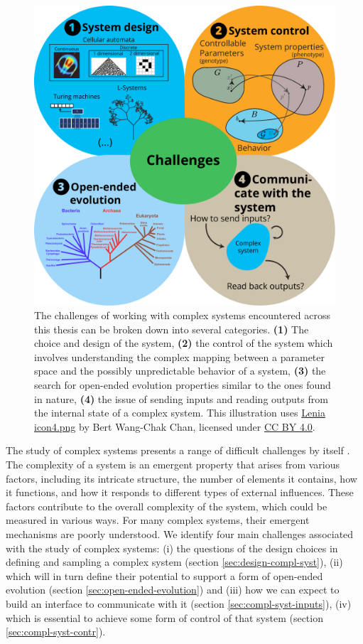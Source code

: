 \begin{figure}[htbp]
  \centering
  \includegraphics[width=.98\linewidth]{figures/challenges}
  \caption{The challenges of working with complex systems encountered across
    this thesis can be broken down into several categories. \textbf{(1)} The choice
    and design of the system, \textbf{(2)} the control of the system which
    involves understanding the complex mapping between a parameter space and the
    possibly unpredictable behavior of a system, \textbf{(3)} the search for
    open-ended evolution properties similar to the ones found in nature,
    \textbf{(4)} the issue of sending inputs and reading outputs from the
    internal state of a complex system. This illustration uses
    \href{https://commons.wikimedia.org/wiki/File:Lenia_icon4.png}{Lenia
      icon4.png} by Bert Wang-Chak Chan, licensed under
    \href{https://creativecommons.org/licenses/by-sa/4.0/}{CC BY 4.0}. }
  \label{fig:challenges}
\end{figure}

The study of complex systems presents a range of difficult challenges by itself
\parencite{sanmiguelChallengesComplexSystems2012}. 
The complexity of a system is an emergent property that arises from various factors, 
including its intricate structure, the number of elements it contains, how it functions, 
and how it responds to different types of external influences. These factors contribute 
to the overall complexity of the system, which could be measured in various ways.
For many complex systems, their emergent mechanisms are
poorly understood. We identify four main challenges associated with the study of
complex systems: (i) the questions of the design choices in defining and sampling a
complex system (section \ref{sec:design-compl-syst}), (ii) which will in turn define
their potential to support a form of open-ended evolution (section
\ref{sec:open-ended-evolution}) and (iii) how we can expect to build an interface to
communicate with it (section \ref{sec:compl-syst-inputs}), (iv) which is essential to
achieve some form of control of that system (section \ref{sec:compl-syst-contr}).

